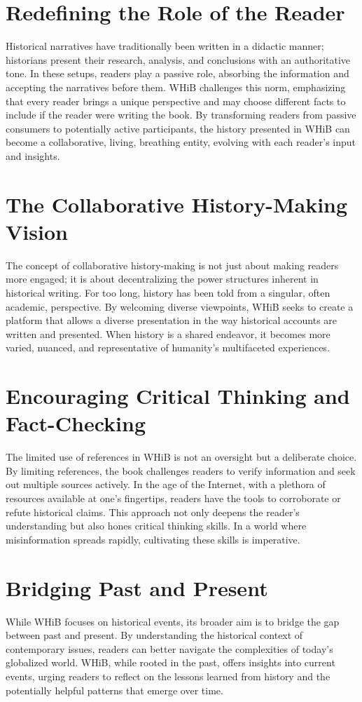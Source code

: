 \documentclass[a4paper,12pt]{book}
\begin{document}
\section*{Redefining the Role of the Reader}
Historical narratives have traditionally been written in a didactic manner; historians present their research, analysis, and conclusions with an authoritative tone. In these setups, readers play a passive role, absorbing the information and accepting the narratives before them. WHiB challenges this norm, emphasizing that every reader brings a unique perspective and may choose different facts to include if the reader were writing the book. By transforming readers from passive consumers to potentially active participants, the history presented in WHiB can become a collaborative, living, breathing entity, evolving with each reader's input and insights.

\section*{The Collaborative History-Making Vision}
The concept of collaborative history-making is not just about making readers more engaged; it is about decentralizing the power structures inherent in historical writing. For too long, history has been told from a singular, often academic, perspective. By welcoming diverse viewpoints, WHiB seeks to create a platform that allows a diverse presentation in the way historical accounts are written and presented. When history is a shared endeavor, it becomes more varied, nuanced, and representative of humanity's multifaceted experiences.

\section*{Encouraging Critical Thinking and Fact-Checking}
The limited use of references in WHiB is not an oversight but a deliberate choice. By limiting references, the book challenges readers to verify information and seek out multiple sources actively. In the age of the Internet, with a plethora of resources available at one's fingertips, readers have the tools to corroborate or refute historical claims. This approach not only deepens the reader's understanding but also hones critical thinking skills. In a world where misinformation spreads rapidly, cultivating these skills is imperative.

\section*{Bridging Past and Present}
While WHiB focuses on historical events, its broader aim is to bridge the gap between past and present. By understanding the historical context of contemporary issues, readers can better navigate the complexities of today's globalized world. WHiB, while rooted in the past, offers insights into current events, urging readers to reflect on the lessons learned from history and the potentially helpful patterns that emerge over time.
\end{document}

